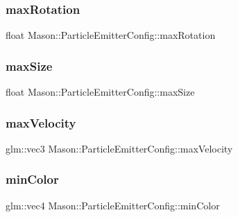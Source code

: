 \subsubsection{\texorpdfstring{max\+Rotation}{maxRotation}}
{\footnotesize\ttfamily float Mason\+::\+Particle\+Emitter\+Config\+::max\+Rotation}

\hypertarget{struct_mason_1_1_particle_emitter_config_ad8b8933ec9758ed264d1b1ccc3d24bd8}{}\label{struct_mason_1_1_particle_emitter_config_ad8b8933ec9758ed264d1b1ccc3d24bd8} 
\subsubsection{\texorpdfstring{max\+Size}{maxSize}}
{\footnotesize\ttfamily float Mason\+::\+Particle\+Emitter\+Config\+::max\+Size}

\hypertarget{struct_mason_1_1_particle_emitter_config_aa449573ac5e8ae2ef3f5110836a3091c}{}\label{struct_mason_1_1_particle_emitter_config_aa449573ac5e8ae2ef3f5110836a3091c} 
\subsubsection{\texorpdfstring{max\+Velocity}{maxVelocity}}
{\footnotesize\ttfamily glm\+::vec3 Mason\+::\+Particle\+Emitter\+Config\+::max\+Velocity}

\hypertarget{struct_mason_1_1_particle_emitter_config_aa70f6e44cc9712bf59ef89e1a339726d}{}\label{struct_mason_1_1_particle_emitter_config_aa70f6e44cc9712bf59ef89e1a339726d} 
\subsubsection{\texorpdfstring{min\+Color}{minColor}}
{\footnotesize\ttfamily glm\+::vec4 Mason\+::\+Particle\+Emitter\+Config\+::min\+Color}

\hypertarget{struct_mason_1_1_particle_emitter_config_ae6755b96da7af8b4c469b64f0887e186}{}\label{struct_mason_1_1_particle_emitter_config_ae6755b96da7af8b4c469b64f0887e186} 
